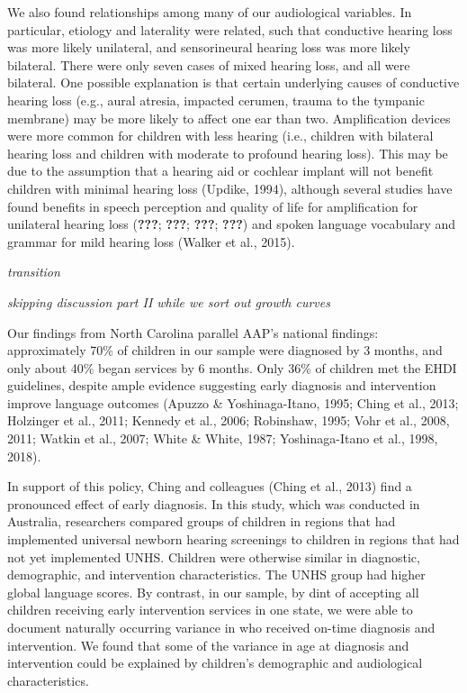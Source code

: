 \documentclass[english,man]{apa6}
\begin{document}
We also found relationships among many of our audiological variables. In particular, etiology and laterality were related, such that conductive hearing loss was more likely unilateral, and sensorineural hearing loss was more likely bilateral. There were only seven cases of mixed hearing loss, and all were bilateral. One possible explanation is that certain underlying causes of conductive hearing loss (e.g., aural atresia, impacted cerumen, trauma to the tympanic membrane) may be more likely to affect one ear than two.
Amplification devices were more common for children with less hearing (i.e., children with bilateral hearing loss and children with moderate to profound hearing loss). This may be due to the assumption that a hearing aid or cochlear implant will not benefit children with minimal hearing loss (Updike, 1994), although several studies have found benefits in speech perception and quality of life for amplification for unilateral hearing loss ({\textbf{???}}; {\textbf{???}}; {\textbf{???}}; {\textbf{???}}) and spoken language vocabulary and grammar for mild hearing loss (Walker et al., 2015).

\emph{transition}

\emph{skipping discussion part II while we sort out growth curves}

Our findings from North Carolina parallel AAP's national findings: approximately 70\% of children in our sample were diagnosed by 3 months, and only about 40\% began services by 6 months. Only 36\% of children met the EHDI guidelines, despite ample evidence suggesting early diagnosis and intervention improve language outcomes (Apuzzo \& Yoshinaga-Itano, 1995; Ching et al., 2013; Holzinger et al., 2011; Kennedy et al., 2006; Robinshaw, 1995; Vohr et al., 2008, 2011; Watkin et al., 2007; White \& White, 1987; Yoshinaga-Itano et al., 1998, 2018).

In support of this policy, Ching and colleagues (Ching et al., 2013) find a pronounced effect of early diagnosis. In this study, which was conducted in Australia, researchers compared groups of children in regions that had implemented universal newborn hearing screenings to children in regions that had not yet implemented UNHS. Children were otherwise similar in diagnostic, demographic, and intervention characteristics. The UNHS group had higher global language scores. By contrast, in our sample, by dint of accepting all children receiving early intervention services in one state, we were able to document naturally occurring variance in who received on-time diagnosis and intervention. We found that some of the variance in age at diagnosis and intervention could be explained by children's demographic and audiological characteristics.
\end{document}
